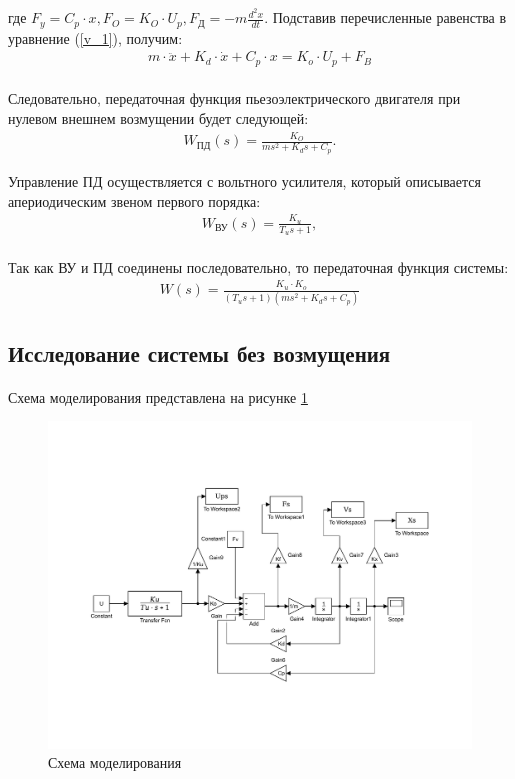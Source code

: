 \documentclass[a4paper,12pt]{article}
\begin{document}
		где $F_y = C_p\cdot x, F_O = K_O\cdot U_p, F_\text{Д} = -m\displaystyle{\frac{d^2x}{d t}}$. Подставив перечисленные равенства в уравнение (\ref{v_1}), получим:
		\begin{gather}
		m\cdot\ddot{x} + K_d\cdot\dot{x} + C_p\cdot x = K_o\cdot U_p + F_B
		\end{gather}\\
		
		Следовательно, передаточная функция пьезоэлектрического двигателя при нулевом внешнем возмущении будет следующей:
		\begin{gather} \label{v_2}
		W_\text{ПД}(s) = \displaystyle{\frac{K_O}{ms^2 + K_ds + C_p}}.
		\end{gather}
		
		Управление ПД осуществляется с вольтного усилителя, который описывается апериодическим звеном первого порядка:
		\begin{gather}
		W_\text{ВУ}(s) = \frac{K_u}{T_us + 1},
		\end{gather}\\
		
		Так как ВУ и ПД соединены последовательно, то передаточная функция системы:
		\begin{gather}
		W(s)=\frac{K_u\cdot K_o}{(T_u s+1)(ms^2+K_d s+C_p)} 
		\end{gather}
	
	
	
	\newpage
	\begin{center}
	\section{Исследование системы без возмущения}
	\end{center}
	\paragraph {} Схема моделирования представлена на рисунке \ref{s_1}
	
	\begin{figure}[h]
		\renewcommand{\figurename}{Рисунок}
		\centering
		\includegraphics[width=6in]{Labb11.pdf}
		\caption{Схема моделирования}
		\label{s_1}
	\end{figure}
\end{document}
